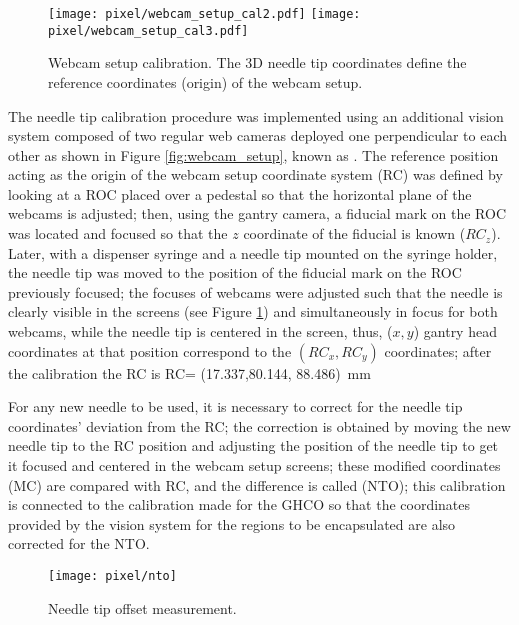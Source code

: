 \begin{figure}[h]
  \begin{center}
    \texttt{[image: pixel/webcam\_setup\_cal2.pdf]}
    \texttt{[image: pixel/webcam\_setup\_cal3.pdf]}\\
    \caption[Webcam setup calibration.]{Webcam setup calibration. The 3D needle tip coordinates define the reference coordinates (origin) of the webcam setup.}\label{fig:webcam_cal}
  \end{center}
\end{figure}

The needle tip calibration procedure was implemented using an additional vision system composed of two regular web cameras deployed one perpendicular to each other as shown in Figure \ref{fig:webcam_setup}, known as . The reference position acting as the origin of the webcam setup coordinate system (RC) was defined by looking at a ROC placed over a pedestal so that the horizontal plane of the webcams is adjusted; then, using the gantry camera, a fiducial mark on the ROC was located and focused so that the $z$ coordinate of the fiducial is known ($RC_z$). Later, with a dispenser syringe and a needle tip mounted on the syringe holder, the needle tip was moved to the position of the fiducial mark on the ROC previously focused; the focuses of webcams were adjusted such that the needle is clearly visible in the screens (see Figure \ref{fig:webcam_cal}) and simultaneously in focus for both webcams, while the needle tip is centered in the screen, thus, ($x,y$) gantry head coordinates at that position correspond to the $(RC_x, RC_y)$ coordinates; after the calibration the RC is
\beqn 
  RC= (17.337,80.144, 88.486)\ mm
\eeqn

For any new needle to be used, it is necessary to correct for the needle tip coordinates' deviation from the RC; the correction is obtained by moving the new needle tip to the RC position and adjusting the position of the needle tip to get it focused and centered in the webcam setup screens; these modified coordinates (MC) are compared with RC, and the difference is called  (NTO); this calibration is connected to the calibration made for the GHCO so that the coordinates provided by the vision system for the regions to be encapsulated are also corrected for the NTO.              

\begin{figure}[h]
  \begin{center}
  \texttt{[image: pixel/nto]}
  \caption[Needle tip offset measurement.]{Needle tip offset measurement.}\label{fig:webcam_adjust}
  \end{center}
\end{figure}

